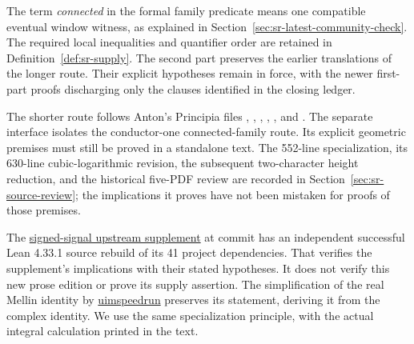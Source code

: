 The term \emph{connected} in the formal family predicate means one
compatible eventual window witness, as explained in
Section~\ref{sec:sr-latest-community-check}.
The required local inequalities and quantifier order are retained in
Definition~\ref{def:sr-supply}.
The second part preserves the earlier translations of the longer route.
Their explicit hypotheses remain in force, with the newer first-part
proofs discharging only the clauses identified in the closing ledger.

The shorter route follows Anton's Principia files
\href{https://principia-math.com/projects/d16ab288ed353bc5b10e292ace0ddbc1/editor?file=d59903a6498c7db021b728233ee6bdc2}{},
\href{https://principia-math.com/projects/d16ab288ed353bc5b10e292ace0ddbc1/editor?file=dfeee1c759dca3c2b8e378a2dec2c780}{},
\href{https://principia-math.com/projects/d16ab288ed353bc5b10e292ace0ddbc1/editor?file=57674e7030ca8ce9bc2b4113ee37ab82}{},
\href{https://principia-math.com/projects/d16ab288ed353bc5b10e292ace0ddbc1/editor?file=150a1ccfbf0ccf9a0b4297260c71c05d}{},
\href{https://principia-math.com/projects/d16ab288ed353bc5b10e292ace0ddbc1/editor?file=116c16d3654fa8b487602e67ead50b96}{},
and
\href{https://principia-math.com/projects/d16ab288ed353bc5b10e292ace0ddbc1/editor?file=41bb998820fe961dbf8e023c9469578b}{}.
The separate
\href{https://principia-math.com/projects/d16ab288ed353bc5b10e292ace0ddbc1/editor?file=c36fb16dbf85efd1520d208bf47edf3a}{}
interface isolates the conductor-one connected-family route.
Its explicit geometric premises must still be proved in a standalone text.
The 552-line specialization, its 630-line cubic-logarithmic revision,
the subsequent two-character height reduction, and the historical
five-PDF review are recorded in
Section~\ref{sec:sr-source-review}; the implications it proves have
not been mistaken for proofs of those premises.

The
\href{https://github.com/leanprover-community/riemann-hypothesis/pull/12}{signed-signal upstream supplement}
at commit 
has an independent successful Lean 4.33.1 source rebuild of its 41 project
dependencies. That verifies the supplement's implications with their
stated hypotheses. It does not verify this new prose edition or prove
its supply assertion.
The simplification of the real Mellin identity by
\href{https://principia-math.com/projects/d16ab288ed353bc5b10e292ace0ddbc1/editor?file=58b04d0292b512962984e43972698e31}{uimspeedrun}
preserves its statement, deriving it from the complex identity.
We use the same specialization principle, with the actual integral
calculation printed in the text.

